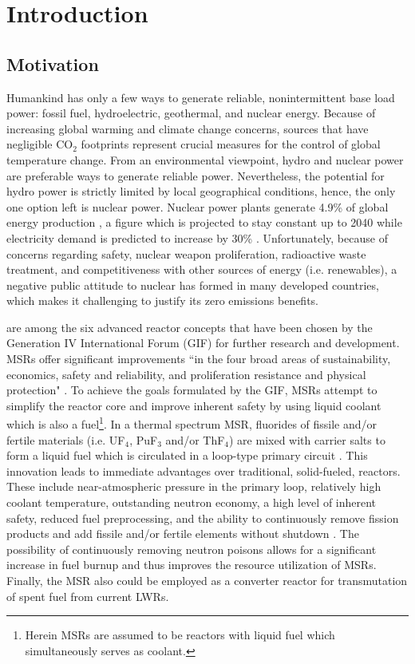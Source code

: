 \chapter[Introduction]{Introduction}

\section{Motivation}

Humankind has only a few ways to generate reliable, nonintermittent 
base load power: fossil fuel, hydroelectric, geothermal, and 
nuclear energy. Because of increasing global warming and climate 
change concerns, sources that have negligible CO$_2$ footprints 
represent crucial measures for the control of global temperature change. 
From an environmental viewpoint, hydro and nuclear power are 
preferable ways to generate reliable power. Nevertheless, the 
potential for hydro power is strictly limited by local geographical 
conditions, hence, the only one option left is nuclear power. Nuclear 
power plants generate 4.9\% of global energy production \cite{noauthor_key_2017}, a figure which is projected to stay constant up to 2040 while 
electricity demand is predicted to increase by 30\% \cite{noauthor_world_2017}.  Unfortunately, because of concerns regarding safety, nuclear weapon 
proliferation, radioactive waste treatment, and competitiveness with 
other sources of energy (i.e. renewables), a negative public attitude 
to nuclear has formed in many developed countries, which makes it 
challenging to justify its zero emissions benefits.

 are among the six advanced reactor 
concepts that have been chosen by the Generation IV International 
Forum (GIF) for further research and development. \glspl{MSR} 
offer significant improvements ``in the four broad areas of 
sustainability, economics, safety and reliability, and proliferation 
resistance and physical protection" \cite{doe_technology_2002}. To 
achieve the goals formulated by the GIF, \glspl{MSR} attempt to 
simplify the reactor core and improve inherent safety by using 
liquid coolant which is also a fuel\footnote{Herein \glspl{MSR} are 
assumed to be reactors with liquid fuel which simultaneously serves 
as coolant.}. In a thermal spectrum \gls{MSR}, fluorides of fissile 
and/or fertile materials (i.e. UF$_4$, PuF$_3$ and/or ThF$_4$) are 
mixed with carrier salts to form a liquid fuel which is circulated 
in a loop-type primary circuit \cite{haubenreich_experience_1970}. 
This innovation leads to immediate advantages over traditional, 
solid-fueled, reactors. These include near-atmospheric pressure 
in the primary loop, relatively high coolant temperature, outstanding 
neutron economy, a high level of inherent safety, reduced fuel 
preprocessing, and the ability to continuously remove fission products 
and add fissile and/or fertile elements without shutdown  \cite{leblanc_molten_2010}. The possibility of continuously removing 
neutron poisons allows for a significant increase in fuel burnup and thus 
improves the resource utilization of \glspl{MSR}. Finally, the \gls{MSR} 
also could be employed as a converter reactor for transmutation of 
spent fuel from current \glspl{LWR}.


